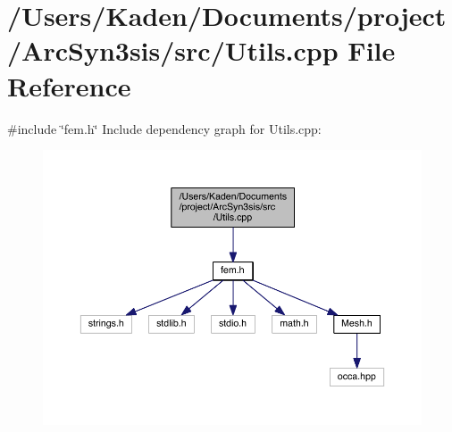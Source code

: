 \hypertarget{a00602}{}\section{/\+Users/\+Kaden/\+Documents/project/\+Arc\+Syn3sis/src/\+Utils.cpp File Reference}
\label{a00602}
{\ttfamily \#include \char`\"{}fem.\+h\char`\"{}}\newline
Include dependency graph for Utils.\+cpp\+:\nopagebreak
\begin{figure}[H]
\begin{center}
\leavevmode
\includegraphics[width=350pt]{a00603}
\end{center}
\end{figure}
